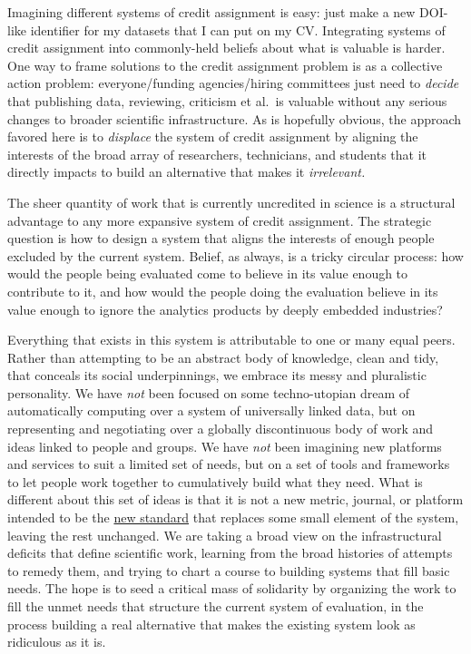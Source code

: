 Imagining different systems of credit assignment is easy: just make a
new DOI-like identifier for my datasets that I can put on my CV.
Integrating systems of credit assignment into commonly-held beliefs
about what is valuable is harder. One way to frame solutions to the
credit assignment problem is as a collective action problem:
everyone/funding agencies/hiring committees just need to \emph{decide}
that publishing data, reviewing, criticism et al.~is valuable without
any serious changes to broader scientific infrastructure. As is
hopefully obvious, the approach favored here is to \emph{displace} the
system of credit assignment by aligning the interests of the broad array
of researchers, technicians, and students that it directly impacts to
build an alternative that makes it \emph{irrelevant.}

The sheer quantity of work that is currently uncredited in science is a
structural advantage to any more expansive system of credit assignment.
The strategic question is how to design a system that aligns the
interests of enough people excluded by the current system. Belief, as
always, is a tricky circular process: how would the people being
evaluated come to believe in its value enough to contribute to it, and
how would the people doing the evaluation believe in its value enough to
ignore the analytics products by deeply embedded industries?

Everything that exists in this system is attributable to one or many
equal peers. Rather than attempting to be an abstract body of knowledge,
clean and tidy, that conceals its social underpinnings, we embrace its
messy and pluralistic personality. We have \emph{not} been focused on
some techno-utopian dream of automatically computing over a system of
universally linked data, but on representing and negotiating over a
globally discontinuous body of work and ideas linked to people and
groups. We have \emph{not} been imagining new platforms and services to
suit a limited set of needs, but on a set of tools and frameworks to let
people work together to cumulatively build what they need. What is
different about this set of ideas is that it is not a new metric,
journal, or platform intended to be the \href{https://xkcd.com/927/}{new
standard} that replaces some small element of the system, leaving the
rest unchanged. We are taking a broad view on the infrastructural
deficits that define scientific work, learning from the broad histories
of attempts to remedy them, and trying to chart a course to building
systems that fill basic needs. The hope is to seed a critical mass of
solidarity by organizing the work to fill the unmet needs that structure
the current system of evaluation, in the process building a real
alternative that makes the existing system look as ridiculous as it is.

